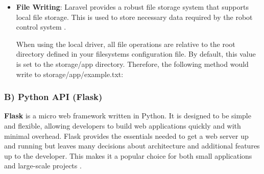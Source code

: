 \begin{itemize}
\begin{itemize}
 \vspace{-4mm}
        
        \item \textbf{File Writing}: Laravel provides a robust file storage system that supports local file storage. This is used to store necessary data required by the robot control system \cite{laravel-filesystem}. 
        
        When using the local driver, all file operations are relative to the root directory defined in your filesystems configuration file. By default, this value is set to the storage/app directory. Therefore, the following method would write to storage/app/example.txt:
        \vspace{1mm}
        
 
    \end{itemize}
\end{itemize}


\subsubsection*{B) Python API (Flask)}

\textbf{Flask} is a micro web framework written in Python. It is designed to be simple and flexible, allowing developers to build web applications quickly and with minimal overhead. Flask provides the essentials needed to get a web server up and running but leaves many decisions about architecture and additional features up to the developer. This makes it a popular choice for both small applications and large-scale projects \cite{flask-quickstart}.


